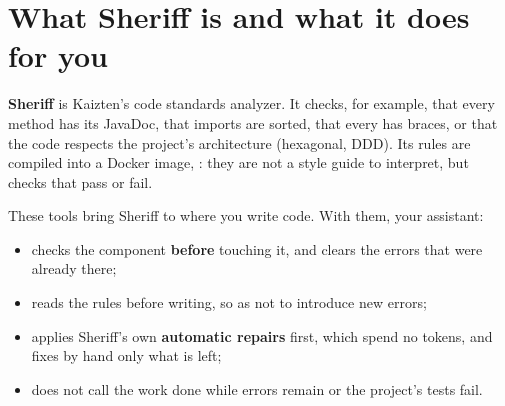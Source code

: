 \documentclass[11pt,a4paper]{article}
\begin{document}
\clearpage
\section{What Sheriff is and what it does for you}
\label{sec:what}

\textbf{Sheriff} is Kaizten's code standards analyzer. It checks, for example,
that every method has its JavaDoc, that imports are sorted, that every
 has braces, or that the code respects the project's architecture
(hexagonal, DDD). Its rules are compiled into a Docker image,
: they are not a style guide to interpret, but checks that
pass or fail.

These tools bring Sheriff to where you write code. With them, your assistant:

\begin{itemize}
  \item checks the component \textbf{before} touching it, and clears the errors
        that were already there;
  \item reads the rules before writing, so as not to introduce new errors;
  \item applies Sheriff's own \textbf{automatic repairs} first, which spend no
        tokens, and fixes by hand only what is left;
  \item does not call the work done while errors remain or the project's tests
        fail.
\end{itemize}
\end{document}
